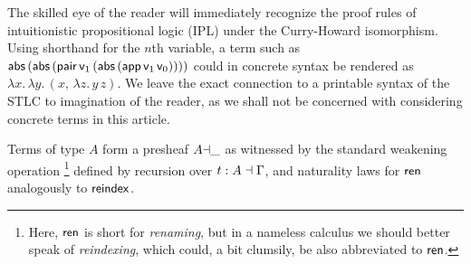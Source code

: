 \documentclass[a4paper,USenglish,cleveref, autoref]{lipics-v2019}
\begin{document}
The skilled eye of the reader will immediately recognize the proof
rules of intuitionistic propositional logic (IPL) under the
Curry-Howard isomorphism.  Using shorthand
 for the $n$th variable,
a term such as
\(
  \mathsf{abs}\,(\mathsf{abs}\,(\mathsf{pair}\,
    \mathsf{v}_{1}\,
    (\mathsf{abs}\,(\mathsf{app}\,\mathsf{v}_{1}\,\mathsf{v}_{0}))))
\)
could in concrete syntax be rendered as
\(
  \lambda x.\,\lambda y.\,(x,\,\lambda z.\,y\,z)
  .
\)
We leave the exact connection to a printable
syntax of the STLC to imagination of the reader,
as we shall not be concerned with considering
concrete terms in this article.

Terms of type $A$ form a presheaf
$A{\dashv}\_$ as witnessed by the standard weakening operation%
\footnote{Here, $\mathsf{ren}$ is short for \emph{renaming}, but in a nameless
calculus we should better speak of \emph{reindexing}, which could, a
bit clumsily, be also abbreviated to $\mathsf{ren}$.}
defined by recursion over $t : A \dashv \Gamma$,
and naturality laws for $\mathsf{ren}$ analogously to $\mathsf{reindex}$.
\end{document}
